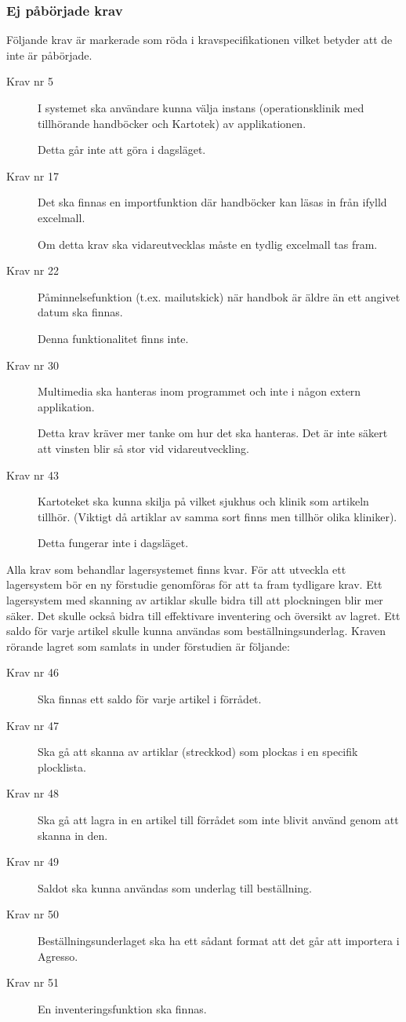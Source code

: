 \documentclass{article}
\begin{document}
\subsubsection{Ej påbörjade krav}
Följande krav är markerade som röda i kravspecifikationen vilket betyder att de inte är påbörjade.

\begin{description}
\item[Krav nr 5]  I systemet ska användare kunna välja instans (operationsklinik med tillhörande handböcker och Kartotek) av applikationen. 

Detta går inte att göra i dagsläget. %
\item[Krav nr 17] Det ska finnas en importfunktion där handböcker kan läsas in från ifylld excelmall.

Om detta krav ska vidareutvecklas måste en tydlig excelmall tas fram.
\item[Krav nr 22] Påminnelsefunktion (t.ex. mailutskick) när handbok är äldre än ett angivet datum ska finnas.

Denna funktionalitet finns inte. %
\item[Krav nr 30] Multimedia ska hanteras inom programmet och inte i någon extern applikation.

Detta krav kräver mer tanke om hur det ska hanteras. Det är inte säkert att vinsten blir så stor vid vidareutveckling.%
\item[Krav nr 43] Kartoteket ska kunna skilja på vilket sjukhus och klinik som artikeln tillhör. (Viktigt då artiklar av samma sort finns men tillhör olika kliniker). 

Detta fungerar inte i dagsläget. %
\end{description}


Alla krav som behandlar lagersystemet finns kvar. För att utveckla ett lagersystem bör en ny förstudie genomföras för att ta fram tydligare krav. Ett lagersystem med skanning av artiklar skulle bidra till att plockningen blir mer säker. Det skulle också bidra till effektivare inventering och översikt av lagret. Ett saldo för varje artikel skulle kunna användas som beställningsunderlag. Kraven rörande lagret som samlats in under förstudien är följande:
\begin{description}
\item[Krav nr 46] Ska finnas ett saldo för varje artikel i förrådet.
\item[Krav nr 47] Ska gå att skanna av artiklar (streckkod) som plockas i en specifik plocklista.
\item[Krav nr 48] Ska gå att lagra in en artikel till förrådet som inte blivit använd genom att skanna in den.
\item[Krav nr 49] Saldot ska kunna användas som underlag till beställning.
\item[Krav nr 50] Beställningsunderlaget ska ha ett sådant format att det går att importera i Agresso.
\item[Krav nr 51] En inventeringsfunktion ska finnas.
\end{description}
\end{document}
